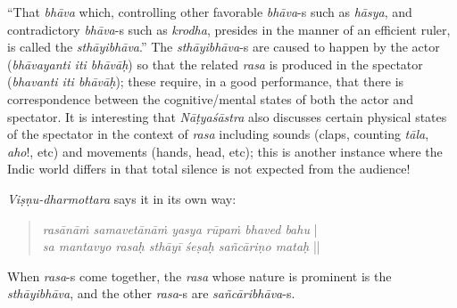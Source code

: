 “That \textsl{bhāva} which, controlling other favorable \textsl{bhāva}-s such as \textsl{hāsya}, and contradictory \textsl{bhāva}-s such as \textsl{krodha}, presides in the manner of an efficient ruler, is called the \textsl{sthāyibhāva}.” The \textsl{sthāyibhāva}-s are caused to happen by the actor (\textsl{bhāvayanti iti bhāvāḥ}) so that the related \textsl{rasa} is produced in the spectator (\textsl{bhavanti iti bhāvāḥ}); these require, in a good performance, that there is correspondence between the cognitive/mental states of both the actor and spectator. It is interesting that \textsl{Nāṭyaśāstra} also discusses certain physical states of the spectator in the context of \textsl{rasa} including sounds (claps, counting \textsl{tāla}, \textsl{aho}!, etc) and movements (hands, head, etc); this is another instance where the Indic world differs in that total silence is not expected from the audience!

\textsl{Viṣṇu-dharmottara} says it in its own way:
\begin{quote}
\textsl{rasānāṁ samavetānāṁ yasya rūpaṁ bhaved bahu} |\\
\textsl{sa mantavyo rasaḥ sthāyī śeṣaḥ sañcāriṇo mataḥ} ||
\end{quote}

When \textsl{rasa}-s come together, the \textsl{rasa} whose nature is prominent is the \textsl{sthāyibhāva}, and the other \textsl{rasa}-s are \textsl{sañcāribhāva}-s.


